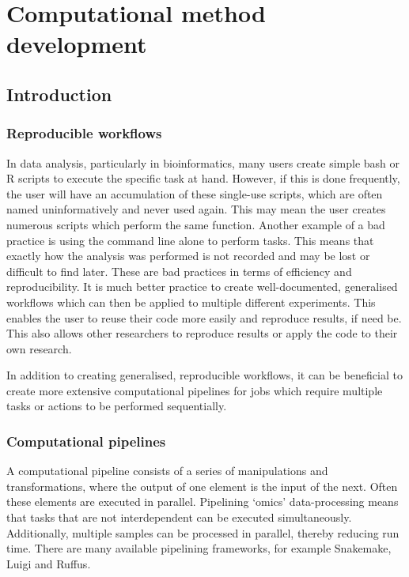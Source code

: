 \chapter{\label{ch:4-Pipelines}Computational method development}


\section{Introduction}

\subsection{Reproducible workflows}
In data analysis, particularly in bioinformatics, many users create simple bash or R scripts to execute the specific task at hand.
However, if this is done frequently, the user will have an accumulation of these single-use scripts, which are often named uninformatively and never used again.
This may mean the user creates numerous scripts which perform the same function.
Another example of a bad practice is using the command line alone to perform tasks.
This means that exactly how the analysis was performed is not recorded and may be lost or difficult to find later.
These are bad practices in terms of efficiency and reproducibility.
It is much better practice to create well-documented, generalised workflows which can then be applied to multiple different experiments.
This enables the user to reuse their code more easily and reproduce results, if need be.
This also allows other researchers to reproduce results or apply the code to their own research.

In addition to creating generalised, reproducible workflows, it can be beneficial to create more extensive computational pipelines for jobs which require multiple tasks or actions to be performed sequentially.

\subsection{Computational pipelines}\label{subsec:computational_pipelines}
A computational pipeline consists of a series of manipulations and transformations, where the output of one element is the input of the next.
Often these elements are executed in parallel.
Pipelining `omics' data-processing means that tasks that are not interdependent can be executed simultaneously.
Additionally, multiple samples can be processed in parallel, thereby reducing run time.
There are many available pipelining frameworks, for example Snakemake\cite{koster2012snakemake}, Luigi and Ruffus\cite{goodstadt2010ruffus}.

